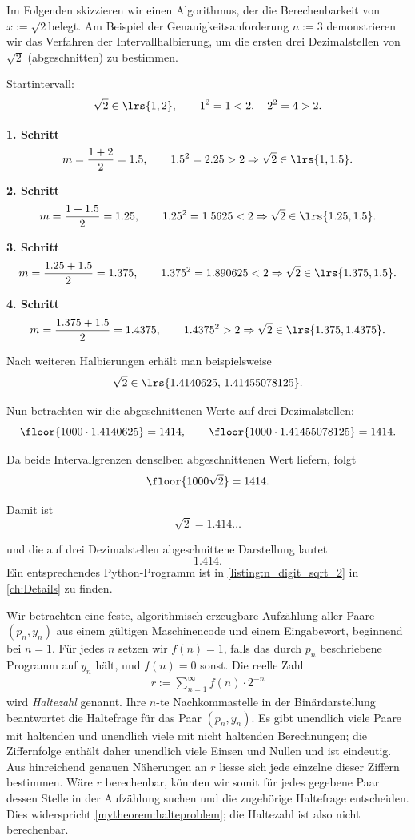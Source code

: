 \begin{myexample}
Im Folgenden skizzieren wir einen Algorithmus, der die Berechenbarkeit von $x:=\sqrt{2}$​ belegt. Am Beispiel der Genauigkeitsanforderung $n:=3$ demonstrieren wir das Verfahren der Intervallhalbierung, um die ersten drei Dezimalstellen von $\sqrt{2}$ (abgeschnitten) zu bestimmen.

Startintervall:
\[
\sqrt{2} \in \lrs{1,2},
\qquad
1^2 = 1 < 2,\quad 2^2 = 4 > 2.
\]

\textbf{1. Schritt}
\[
m=\frac{1+2}{2}=1.5,\qquad 1.5^2=2.25>2 \Rightarrow \sqrt{2}\in\lrs{1,1.5}.
\]

\textbf{2. Schritt}
\[
m=\frac{1+1.5}{2}=1.25,\qquad 1.25^2=1.5625<2 \Rightarrow \sqrt{2}\in\lrs{1.25,1.5}.
\]

\textbf{3. Schritt}
\[
m=\frac{1.25+1.5}{2}=1.375,\qquad 1.375^2=1.890625<2 \Rightarrow \sqrt{2}\in\lrs{1.375,1.5}.
\]

\textbf{4. Schritt}
\[
m=\frac{1.375+1.5}{2}=1.4375,\qquad 1.4375^2>2 \Rightarrow \sqrt{2}\in\lrs{1.375,1.4375}.
\]

Nach weiteren Halbierungen erhält man beispielsweise
\[
\sqrt{2}\in\lrs{1.4140625,\,1.41455078125}.
\]

Nun betrachten wir die abgeschnittenen Werte auf drei Dezimalstellen:
\[
\floor{1000\cdot 1.4140625} = 1414,
\qquad
\floor{1000\cdot 1.41455078125} = 1414.
\]

Da beide Intervallgrenzen denselben abgeschnittenen Wert liefern, folgt
\[
\floor{1000\sqrt{2}} = 1414.
\]

Damit ist
\[
\sqrt{2}=1.414\ldots
\]

und die auf drei Dezimalstellen abgeschnittene Darstellung lautet
\[
1.414.
\]
Ein entsprechendes Python-Programm ist in \cref{listing:n_digit_sqrt_2} in \cref{ch:Details} zu finden.
\end{myexample}

\begin{myexample}
Wir betrachten eine feste, algorithmisch erzeugbare Aufzählung aller Paare $(p_n,y_n)$ aus einem gültigen Maschinencode und einem Eingabewort, beginnend bei $n=1$. Für jedes $n$ setzen wir $f(n)=1$, falls das durch $p_n$ beschriebene Programm auf $y_n$ hält, und $f(n)=0$ sonst. Die reelle Zahl
\begin{align*}
	r := \sum_{n=1}^{\infty}f(n)\cdot 2^{-n}
\end{align*}
wird \emph{Haltezahl} genannt. Ihre $n$-te Nachkommastelle in der Binärdarstellung beantwortet die Haltefrage für das Paar $(p_n,y_n)$. Es gibt unendlich viele Paare mit haltenden und unendlich viele mit nicht haltenden Berechnungen; die Ziffernfolge enthält daher unendlich viele Einsen und Nullen und ist eindeutig. Aus hinreichend genauen Näherungen an $r$ liesse sich jede einzelne dieser Ziffern bestimmen. Wäre $r$ berechenbar, könnten wir somit für jedes gegebene Paar dessen Stelle in der Aufzählung suchen und die zugehörige Haltefrage entscheiden. Dies widerspricht \cref{mytheorem:halteproblem}; die Haltezahl ist also nicht berechenbar.
\end{myexample}

